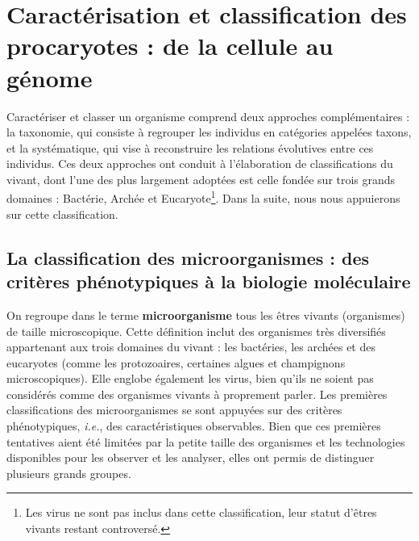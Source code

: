 \chapter{Caractérisation et classification des procaryotes : de la cellule au génome}

Caractériser et classer un organisme comprend deux approches complémentaires : la taxonomie, qui consiste à regrouper les individus en catégories appelées taxons, et la systématique, qui vise à reconstruire les relations évolutives entre ces individus. Ces deux approches ont conduit à l’élaboration de classifications du vivant, dont l’une des plus largement adoptées est celle fondée sur trois grands domaines : Bactérie, Archée et Eucaryote\footnote{Les virus ne sont pas inclus dans cette classification, leur statut d’êtres vivants restant controversé.}. Dans la suite, nous nous appuierons sur cette classification.

\section{La classification des microorganismes : des critères phénotypiques à la biologie moléculaire}

On regroupe dans le terme \textbf{microorganisme} tous les êtres vivants (organismes) de taille microscopique. Cette définition inclut des organismes très diversifiés appartenant aux trois domaines du vivant : les bactéries, les archées et des eucaryotes (comme les protozoaires, certaines algues et champignons microscopiques). Elle englobe également les virus, bien qu'ils ne soient pas considérés comme des organismes vivants à proprement parler. Les premières classifications des microorganismes se sont appuyées sur des critères phénotypiques, \textit{i.e.}, des caractéristiques observables. Bien que ces premières tentatives aient été limitées par la petite taille des organismes et les technologies disponibles pour les observer et les analyser, elles ont permis de distinguer plusieurs grands groupes.

